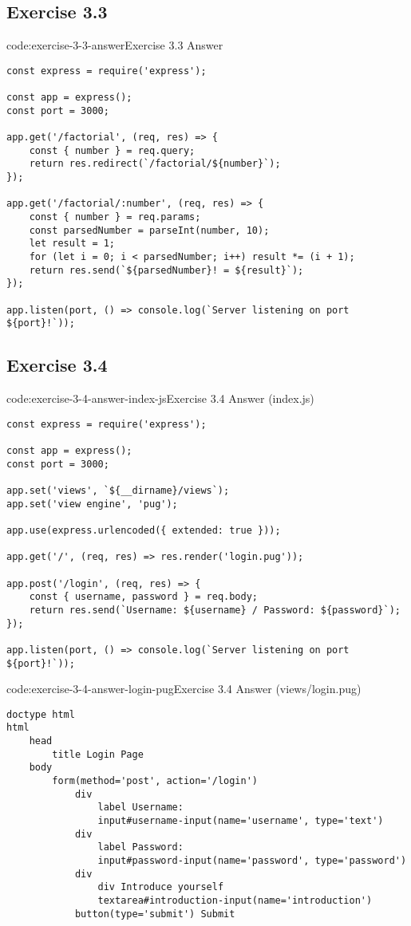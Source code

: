 \subsection*{Exercise 3.3}

\begin{codeenv}{code:exercise-3-3-answer}{Exercise 3.3 Answer}\begin{verbatim}
const express = require('express');

const app = express();
const port = 3000;

app.get('/factorial', (req, res) => {
    const { number } = req.query;
    return res.redirect(`/factorial/${number}`);
});

app.get('/factorial/:number', (req, res) => {
    const { number } = req.params;
    const parsedNumber = parseInt(number, 10);
    let result = 1;
    for (let i = 0; i < parsedNumber; i++) result *= (i + 1);
    return res.send(`${parsedNumber}! = ${result}`);
});

app.listen(port, () => console.log(`Server listening on port ${port}!`));
\end{verbatim}
\end{codeenv}

\subsection*{Exercise 3.4}

\begin{codeenv}{code:exercise-3-4-answer-index-js}{Exercise 3.4 Answer (index.js)}\begin{verbatim}
const express = require('express');

const app = express();
const port = 3000;

app.set('views', `${__dirname}/views`);
app.set('view engine', 'pug');

app.use(express.urlencoded({ extended: true }));

app.get('/', (req, res) => res.render('login.pug'));

app.post('/login', (req, res) => {
    const { username, password } = req.body;
    return res.send(`Username: ${username} / Password: ${password}`);
});

app.listen(port, () => console.log(`Server listening on port ${port}!`));
\end{verbatim}
\end{codeenv}

\begin{codeenv}{code:exercise-3-4-answer-login-pug}{Exercise 3.4 Answer (views/login.pug)}\begin{verbatim}
doctype html
html
    head
        title Login Page
    body
        form(method='post', action='/login')
            div
                label Username:
                input#username-input(name='username', type='text')
            div
                label Password:
                input#password-input(name='password', type='password')
            div
                div Introduce yourself
                textarea#introduction-input(name='introduction')
            button(type='submit') Submit
\end{verbatim}
\end{codeenv}
